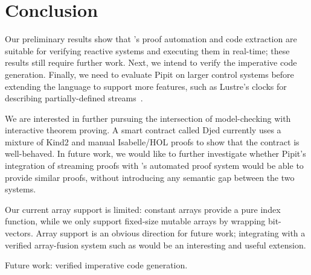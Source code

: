 
\section{Conclusion}


Our preliminary results show that \fstar{}'s proof automation and code extraction are suitable for verifying reactive systems and executing them in real-time; these results still require further work.
Next, we intend to verify the imperative code generation.
Finally, we need to evaluate Pipit on larger control systems before extending the language to support more features, such as Lustre's clocks for describing partially-defined streams~\cite{caspi1995functional}.


We are interested in further pursuing the intersection of model-checking with interactive theorem proving.
A smart contract called Djed \cite{zahnentferner2023djed} currently uses a mixture of Kind2 \cite{champion2016kind2} and manual Isabelle/HOL proofs to show that the contract is well-behaved.
In future work, we would like to further investigate whether Pipit's integration of streaming proofs with \fstar{}'s automated proof system would be able to provide similar proofs, without introducing any semantic gap between the two systems.

Our current array support is limited: constant arrays provide a pure index function, while we only support fixed-size mutable arrays by wrapping bit-vectors.
Array support is an obvious direction for future work; integrating with a verified array-fusion system such as \cite{robinson2017machine} would be an interesting and useful extension.

Future work: verified imperative code generation.
